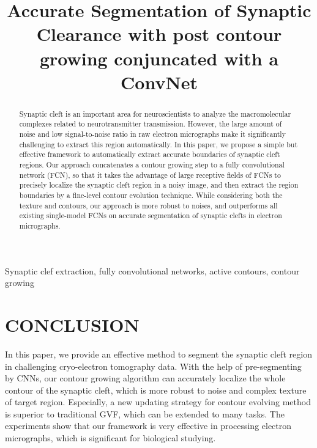 \documentclass{article}
\begin{document}
\sloppy

\def\x{{\mathbf x}}
\def\L{{\cal L}}


\title{Accurate Segmentation of Synaptic Clearance with post contour growing conjuncated with a ConvNet}
%
\address{}


\maketitle


%
\begin{abstract}

Synaptic cleft is an important area for neuroscientists to analyze the macromolecular complexes related to neurotransmitter transmission.
However, the large amount of noise and low signal-to-noise ratio in raw electron micrographs make it significantly challenging to extract this region automatically.
%
In this paper, we propose a simple but effective framework to automatically extract accurate boundaries of synaptic cleft regions.
Our approach concatenates a contour growing step to a fully convolutional network (FCN), so that it takes the advantage of large receptive fields of FCNs to precisely localize the synaptic cleft region in a noisy image, and then extract the region boundaries by a fine-level contour evolution technique.
%
While considering both the texture and contours, our approach is more robust to noises, and outperforms all existing single-model FCNs on accurate segmentation of synaptic clefts in electron micrographs.

 
\end{abstract}
%
\begin{keywords}
Synaptic clef extraction, fully convolutional networks, active contours, contour growing
\end{keywords}
%

%


\section{CONCLUSION}
\label{sec:conclusion}
In this paper, we provide an effective method to segment the synaptic cleft region in challenging cryo-electron tomography data.
With the help of pre-segmenting by CNNs, our contour growing algorithm can accurately localize the whole contour of the synaptic cleft, which is more robust to noise and complex texture of target region.
Especially, a new updating strategy for contour evolving method is superior to traditional GVF, which can be extended to many tasks.
The experiments show that our framework is very effective in processing electron micrographs, which is significant for biological studying.

%
%


\end{document}

